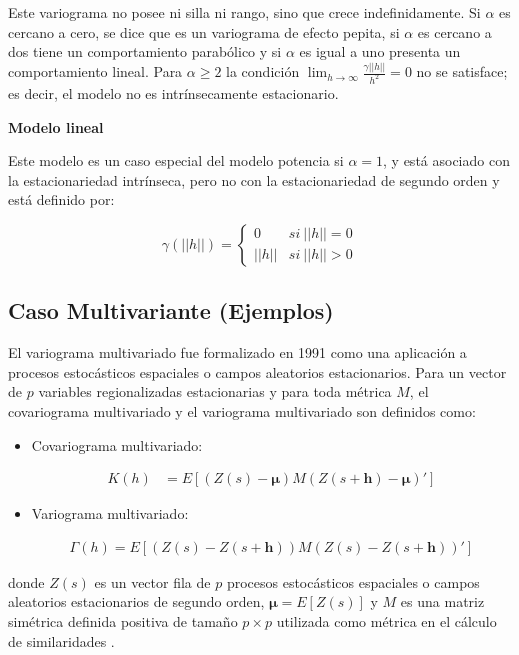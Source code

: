 \documentclass[
]{book}
\begin{document}
Este variograma no posee ni silla ni rango, sino que crece indefinidamente. Si \(\alpha\) es cercano a cero, se dice que es un variograma de efecto pepita, si \(\alpha\) es cercano a dos tiene un comportamiento parabólico y si \(\alpha\) es igual a uno presenta un comportamiento lineal. Para \(\alpha\geq 2\) la condición \(\lim_{h\to \infty}\frac{\gamma||h||}{h^2}=0\) no se satisface; es decir, el modelo no es intrínsecamente estacionario.

\textbf{Modelo lineal}

Este modelo es un caso especial del modelo potencia si \(\alpha=1\), y está asociado con la estacionariedad intrínseca, pero no con la estacionariedad de segundo orden y está definido por:

\[
          \gamma(||h||)=\left \{ \begin{matrix} 0 & si\ ||h||=0\\ ||h|| & si\ ||h||>0 \end{matrix}\right.  
\]

\hypertarget{caso-multivariante-ejemplos}{%
\subsection{Caso Multivariante (Ejemplos)}\label{caso-multivariante-ejemplos}}

El variograma multivariado fue formalizado en 1991 como una aplicación a procesos estocásticos espaciales o campos aleatorios estacionarios. Para un vector de \(p\) variables regionalizadas estacionarias y para toda métrica \(M\), el covariograma multivariado y el variograma multivariado son definidos como:

\begin{itemize}
\item
  Covariograma multivariado:

  \begin{align*}
        K(h)&=E[(Z(s)-\boldsymbol \mu)M(Z(s+\textbf{h})-\boldsymbol \mu){'}]
    \end{align*}
\item
  Variograma multivariado:

  \begin{align*}
        \Gamma(h)=E[(Z(s)-Z(s+\textbf{h}))M(Z(s)-Z(s+\textbf{h}))']
    \end{align*}
\end{itemize}

donde \(Z(s)\) es un vector fila de \(p\) procesos estocásticos espaciales o campos aleatorios estacionarios de segundo orden, \(\boldsymbol \mu=E[Z(s)]\) y \(M\) es una matriz simétrica definida positiva de tamaño \(p\times p\) utilizada como métrica en el cálculo de similaridades \citep{borou}.
\end{document}
